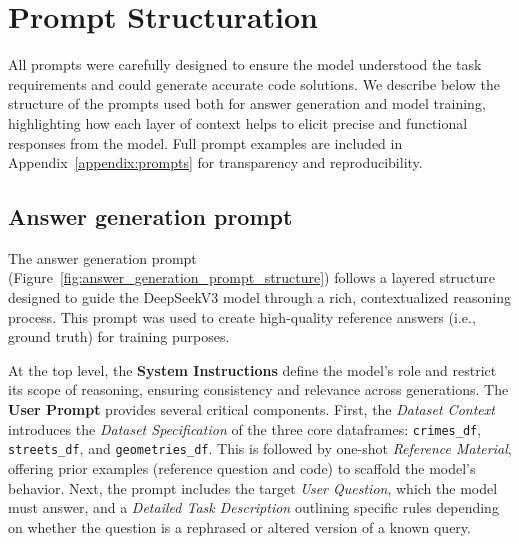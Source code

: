 


\section{Prompt Structuration}

All prompts were carefully designed to ensure the model understood the task requirements and could generate accurate code solutions. We describe below the structure of the prompts used both for answer generation and model training, highlighting how each layer of context helps to elicit precise and functional responses from the model. Full prompt examples are included in Appendix~\ref{appendix:prompts} for transparency and reproducibility.

\subsection{Answer generation prompt}

The answer generation prompt (Figure~\ref{fig:answer_generation_prompt_structure}) follows a layered structure designed to guide the DeepSeekV3 model through a rich, contextualized reasoning process. This prompt was used to create high-quality reference answers (i.e., ground truth) for training purposes.

At the top level, the \textbf{System Instructions} define the model’s role and restrict its scope of reasoning, ensuring consistency and relevance across generations. The \textbf{User Prompt} provides several critical components. First, the \textit{Dataset Context} introduces the \textit{Dataset Specification} of the three core dataframes: \texttt{crimes\_df}, \texttt{streets\_df}, and \texttt{geometries\_df}. This is followed by one-shot \textit{Reference Material}, offering prior examples (reference question and code) to scaffold the model’s behavior. Next, the prompt includes the target \textit{User Question}, which the model must answer, and a \textit{Detailed Task Description} outlining specific rules depending on whether the question is a rephrased or altered version of a known query.

